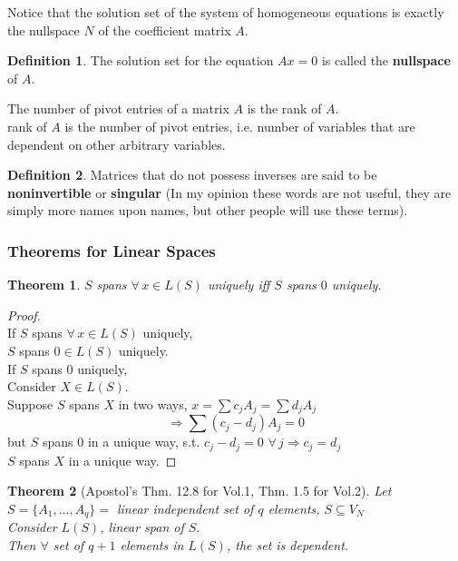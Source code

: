 \documentclass[twoside]{amsart}
\theoremstyle{plain}
\newtheorem{theorem}{Theorem}
\theoremstyle{definition}
\newtheorem{definition}{Definition}
\begin{document}
\begin{marginpar}{\footnotesize{ Notice that the solution set of the system of homogeneous equations is exactly the nullspace $N$ of the coefficient matrix $A$. }  }
\end{marginpar}
\begin{definition}
The solution set for the equation $Ax=0$ is called the \textbf{nullspace} of $A$.  

\noindent The number of pivot entries of a matrix $A$ is the rank of $A$.  \\
\phantom{The} rank of $A$ is the number of pivot entries, i.e. number of variables that are dependent on other arbitrary variables.  
\end{definition}

\begin{definition}\label{D:Invertible_terms}
Matrices that do not possess inverses are said to be \textbf{ noninvertible } or \textbf{ singular } (In my opinion these words are not useful, they are simply more names upon names, but other people will use these terms).  
\end{definition}

\subsubsection{Theorems for Linear Spaces}\label{subsubS:Theorems_Linear_Spaces}

\begin{theorem}
  $S$ spans $\forall \, x \in L(S)$ uniquely iff $S$ spans $0$ uniquely.  
\end{theorem}

\begin{proof} \quad \\
  If $S$ spans $\forall \, x \in L(S)$ uniquely, \\
  \phantom{ If } $S$ spans $0 \in L(S)$ uniquely.  \medskip \\
  If $S$ spans $0$ uniquely, \\
  \phantom{ If } Consider $X \in L(S)$.  \\
  \phantom{ If } Suppose $S$ spans $X$ in two ways, $x = \sum c_j A_j = \sum d_j A_j$ 
\[
\Longrightarrow \sum (c_j - d_j) A_j = 0 
\]
but $S$ spans $0$ in a unique way, s.t. $c_j - d_j =0$ \quad $\forall \, j \Longrightarrow c_j = d_j$ \\
$S$ spans $X$ in a unique way.  
\end{proof}

\begin{theorem}[Apostol's Thm. 12.8 for Vol.1, Thm. 1.5 for Vol.2]\label{T:Apostol_Thm_12.8_Vol01}
  Let $S = \{ A_1, \dots, A_q \} = $ linear independent set of $q$ elements, $S \subseteq V_N$ \medskip \\
  Consider $L(S)$, linear span of $S$.   \smallskip \\
  Then $\forall$ set of $q+1$ elements in $L(S)$, the set is dependent.  
\end{theorem}
\end{document}
